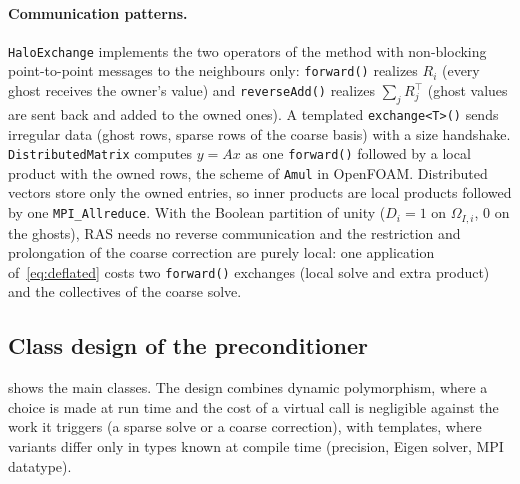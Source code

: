 \documentclass[11pt,a4paper]{article}
\begin{document}
\paragraph{Communication patterns.} \texttt{HaloExchange} implements the two operators of the method with
non-blocking point-to-point messages to the neighbours only: \texttt{forward()} realizes $R_i$ (every ghost
receives the owner's value) and \texttt{reverseAdd()} realizes $\sum_j R_j^\top$ (ghost values are sent back
and added to the owned ones). A templated \texttt{exchange<T>()} sends irregular data (ghost rows, sparse rows
of the coarse basis) with a size handshake. \texttt{DistributedMatrix} computes $y=Ax$ as one
\texttt{forward()} followed by a local product with the owned rows, the scheme of \texttt{Amul} in
OpenFOAM. Distributed vectors store only the owned entries, so inner products are local products followed by
one \texttt{MPI\_Allreduce}. With the Boolean partition of unity ($D_i=1$ on $\Omega_{I,i}$, $0$ on the
ghosts), RAS needs no reverse communication and the restriction and prolongation of the coarse correction
are purely local: one application of~\eqref{eq:deflated} costs two \texttt{forward()} exchanges (local solve
and extra product) and the collectives of the coarse solve.

\subsection{Class design of the preconditioner}\label{sec:classes}

 shows the main classes. The design combines dynamic polymorphism, where a choice is made
at run time and the cost of a virtual call is negligible against the work it triggers (a sparse solve or a
coarse correction), with templates, where variants differ only in types known at compile time (precision,
Eigen solver, MPI datatype).
\end{document}
